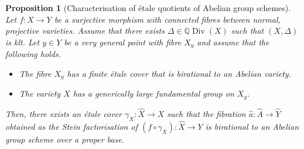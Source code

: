 \documentclass[JEP,XML,SOM,Unicode,published]{cedram}
\theoremstyle{plain}
\newtheorem{prop}[thm]{Proposition}
\theoremstyle{definition}
\numberwithin{equation}{thm}
\numberwithin{enumi}{thm}
\DeclareMathOperator{\Div}{Div}
\newcommand{\bQ}{\mathbb{Q}}
\let\what\widehat
\begin{document}
\begin{prop}[Characterisation of étale quotients of Abelian group schemes]\label{prop:K63}
Let $f : X \to Y$ be a surjective morphism with connected fibres between normal,
projective varieties. Assume that there exists $\Delta \in \bQ\Div(X)$ such that
$(X,\Delta)$ is klt. Let $y \in Y$ be a very general point with fibre $X_y$ and
assume that the following holds.
\begin{itemize}
\item The fibre $X_y$ has a finite étale cover that is birational to an
Abelian variety.

\item The variety $X$ has a generically large fundamental group on $X_y$.
\end{itemize}
Then, there exists an étale cover $\gamma_X : \what{X} \to X$ such that the fibration
$\what{a} : \what{A} \to \what{Y}$ obtained as the Stein factorisation of
$(f\circ \gamma_X) : \what{X} \to Y$ is birational to an Abelian group scheme over a
proper base.
\end{prop}
\end{document}
